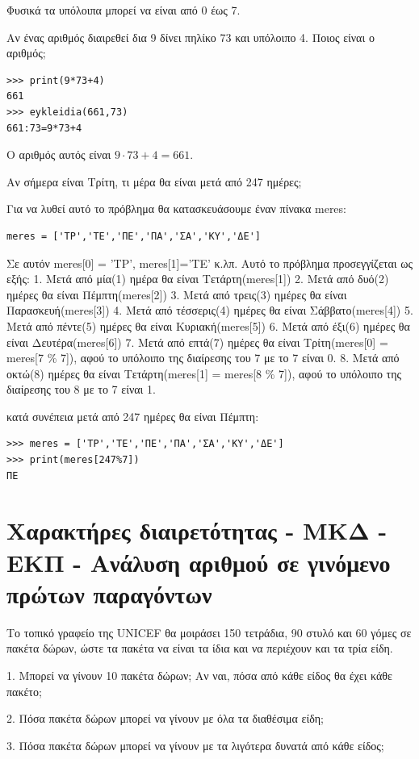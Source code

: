 Φυσικά τα υπόλοιπα μπορεί να είναι από 0 έως 7.


\begin{exercise} Αν ένας αριθμός διαιρεθεί δια 9 δίνει πηλίκο 73 και υπόλοιπο 4. Ποιος είναι ο αριθμός;\end{exercise}

\begin{lstlisting}
>>> print(9*73+4)
661
>>> eykleidia(661,73)
661:73=9*73+4
\end{lstlisting}

Ο αριθμός αυτός είναι $9\cdot 73+4 = 661$.

\begin{exercise} Αν σήμερα είναι Τρίτη, τι μέρα θα είναι μετά από 247 ημέρες;\end{exercise}

Για να λυθεί αυτό το πρόβλημα θα κατασκευάσουμε έναν πίνακα meres:
\begin{lstlisting}
meres = ['ΤΡ','ΤΕ','ΠΕ','ΠΑ','ΣΑ','ΚΥ','ΔΕ']
\end{lstlisting}
Σε αυτόν meres[0] = 'ΤΡ', meres[1]='ΤΕ' κ.λπ.
Αυτό το πρόβλημα προσεγγίζεται ως εξής:
1. Μετά από μία(1) ημέρα θα είναι Τετάρτη(meres[1])
2. Μετά από δυό(2) ημέρες θα είναι Πέμπτη(meres[2])
3. Μετά από τρεις(3) ημέρες θα είναι Παρασκευή(meres[3])
4. Μετά από τέσσερις(4) ημέρες θα είναι Σάββατο(meres[4])
5. Μετά από πέντε(5) ημέρες θα είναι Κυριακή(meres[5])
6. Μετά από έξι(6) ημέρες θα είναι Δευτέρα(meres[6])
7. Μετά από επτά(7) ημέρες θα είναι Τρίτη(meres[0] = meres[7 \% 7]), αφού το υπόλοιπο της διαίρεσης του 7 με το 7 είναι 0.
8. Μετά από οκτώ(8) ημέρες θα είναι Τετάρτη(meres[1] = meres[8 \% 7]), αφού το υπόλοιπο της διαίρεσης του 8 με το 7 είναι 1.

κατά συνέπεια μετά από 247 ημέρες θα είναι Πέμπτη:
\begin{lstlisting}
>>> meres = ['ΤΡ','ΤΕ','ΠΕ','ΠΑ','ΣΑ','ΚΥ','ΔΕ']
>>> print(meres[247%7])
ΠΕ
\end{lstlisting}
\section{Χαρακτήρες διαιρετότητας - ΜΚΔ - ΕΚΠ - Ανάλυση αριθμού σε γινόμενο πρώτων παραγόντων}
\begin{exercise}Το τοπικό γραφείο της UNICEF θα μοιράσει 150 τετράδια, 90 στυλό και 60 γόμες σε πακέτα δώρων, ώστε τα πακέτα να είναι τα ίδια και να περιέχουν και τα τρία είδη.\end{exercise}
\begin{exercise} 1. Μπορεί να γίνουν 10 πακέτα δώρων; Αν ναι, πόσα από κάθε είδος θα έχει κάθε πακέτο;\end{exercise}
\begin{exercise} 2. Πόσα πακέτα δώρων μπορεί να γίνουν με όλα τα διαθέσιμα είδη;\end{exercise}
\begin{exercise} 3. Πόσα πακέτα δώρων μπορεί να γίνουν με τα λιγότερα δυνατά από κάθε είδος;\end{exercise}

